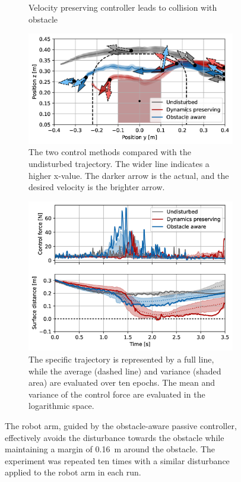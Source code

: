 \begin{figure}
\begin{subfigure}{\columnwidth}
      \caption{Velocity preserving controller leads to collision with obstacle}
      \label{fig:franka_sequence_obstacle_aware}
    \end{subfigure}
    \begin{subfigure}{\columnwidth}
      \centerline{\includegraphics[width=\textwidth]{figures/robot_arm_trajectory_xyz.jpg}}
      \caption{The two control methods compared with the undisturbed trajectory. The wider line indicates a higher x-value. The darker arrow is the actual, and the desired velocity is the brighter arrow.}
      \label{fig:robot_arm_trajectory_xyz}
    \end{subfigure}
    \begin{subfigure}{\columnwidth}
		\includegraphics[width=\textwidth]{figures/trajectory_comparison_force_and_distance.jpeg}
      \caption{The specific trajectory is represented by a full line, while the average (dashed line) and variance (shaded area) are evaluated over ten epochs. The mean and variance of the control force are evaluated in the logarithmic space.}
      \label{fig:trajectory_comparison_force_and_distance}
    \end{subfigure}
	\caption{
The robot arm, guided by the obstacle-aware passive controller, effectively avoids the disturbance towards the obstacle while maintaining a margin of \qty{0.16}{m} around the obstacle. The experiment was repeated ten times with a similar disturbance applied to the robot arm in each run.
 }  
    \label{fig:evaluation_on_robot_arm}
\end{figure}
\fi

